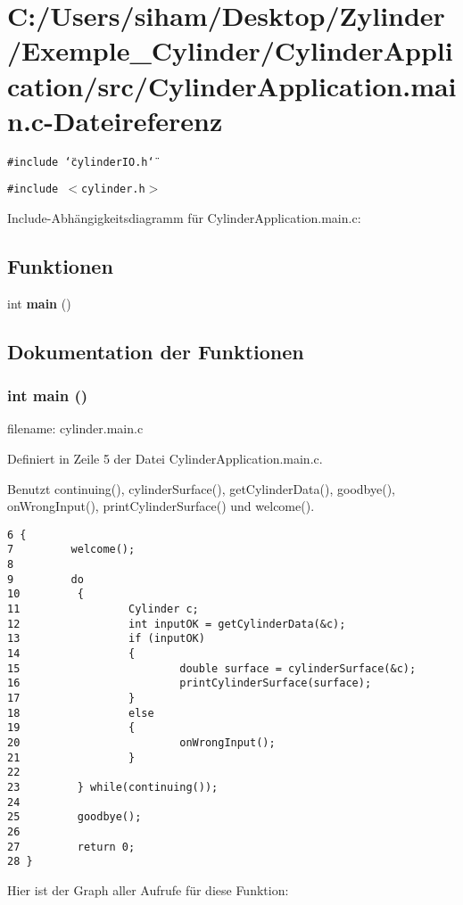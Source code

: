 \section{C:/Users/siham/Desktop/Zylinder/Exemple\_\-Cylinder/Cylinder\-Application/src/Cylinder\-Application.main.c-Dateireferenz}
\label{_cylinder_application_8main_8c}
{\tt \#include \char`\"{}cylinder\-IO.h\char`\"{}}\par
{\tt \#include $<$cylinder.h$>$}\par


Include-Abh\"{a}ngigkeitsdiagramm f\"{u}r Cylinder\-Application.main.c:\subsection*{Funktionen}
\begin{CompactItemize}
\item 
int {\bf main} ()
\end{CompactItemize}


\subsection{Dokumentation der Funktionen}
\subsubsection{\setlength{\rightskip}{0pt plus 5cm}int main ()}\label{_cylinder_application_8main_8c_ea83b916b3f52eec32ae6d54d59b4453}


filename: cylinder.main.c 

Definiert in Zeile 5 der Datei Cylinder\-Application.main.c.

Benutzt continuing(), cylinder\-Surface(), get\-Cylinder\-Data(), goodbye(), on\-Wrong\-Input(), print\-Cylinder\-Surface() und welcome().

\footnotesize\begin{verbatim}6 {
7         welcome();
8 
9         do
10         {
11                 Cylinder c;
12                 int inputOK = getCylinderData(&c);
13                 if (inputOK) 
14                 {
15                         double surface = cylinderSurface(&c);
16                         printCylinderSurface(surface);
17                 } 
18                 else 
19                 {
20                         onWrongInput();
21                 }
22 
23         } while(continuing());
24 
25         goodbye();
26 
27         return 0;
28 }
\end{verbatim}\normalsize 




Hier ist der Graph aller Aufrufe f\"{u}r diese Funktion: